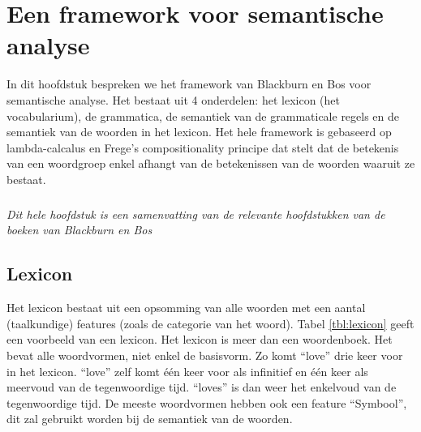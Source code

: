\chapter{Een framework voor semantische analyse}
\label{ch:framework}
In dit hoofdstuk bespreken we het framework van Blackburn en Bos \cite{Blackburn2005, Blackburn2006} voor semantische analyse. Het bestaat uit 4 onderdelen: het lexicon (het vocabularium), de grammatica, de semantiek van de grammaticale regels en de semantiek van de woorden in het lexicon. Het hele framework is gebaseerd op lambda-calcalus en Frege's compositionality principe dat stelt dat de betekenis van een woordgroep enkel afhangt van de betekenissen van de woorden waaruit ze bestaat.

\paragraph{} \textit{Dit hele hoofdstuk is een samenvatting van de relevante hoofdstukken van de boeken van Blackburn en Bos \cite{Blackburn2005, Blackburn2006}}

\section{Lexicon}
Het lexicon bestaat uit een opsomming van alle woorden met een aantal (taalkundige) features (zoals de categorie van het woord). Tabel \ref{tbl:lexicon} geeft een voorbeeld van een lexicon. Het lexicon is meer dan een woordenboek. Het bevat alle woordvormen, niet enkel de basisvorm. Zo komt ``love'' drie keer voor in het lexicon. ``love'' zelf komt één keer voor als infinitief en één keer als meervoud van de tegenwoordige tijd. ``loves'' is dan weer het enkelvoud van de tegenwoordige tijd. De meeste woordvormen hebben ook een feature ``Symbool'', dit zal gebruikt worden bij de semantiek van de woorden.

